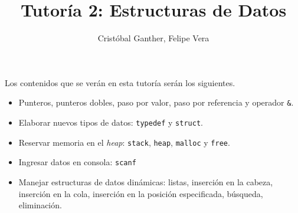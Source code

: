\documentclass[letterpaper,10pt]{article}
\title{Tutoría 2: Estructuras de Datos}
\author{Cristóbal Ganther, Felipe Vera}
\begin{document}
\maketitle

Los contenidos que se verán en esta tutoría serán los siguientes.
\begin{itemize}
  \item Punteros, punteros dobles, paso por valor, paso por referencia y operador \texttt{\&}.
  \item Elaborar nuevos tipos de datos: \texttt{typedef} y \texttt{struct}.
  \item Reservar memoria en el \textit{heap}: \texttt{stack}, \texttt{heap}, \texttt{malloc} y \texttt{free}.
  \item Ingresar datos en consola: \texttt{scanf}
  \item Manejar estructuras de datos dinámicas: listas, inserción en la cabeza, inserción en la cola, inserción en la posición
  especificada, búsqueda, eliminación.
\end{itemize}
\end{document}
